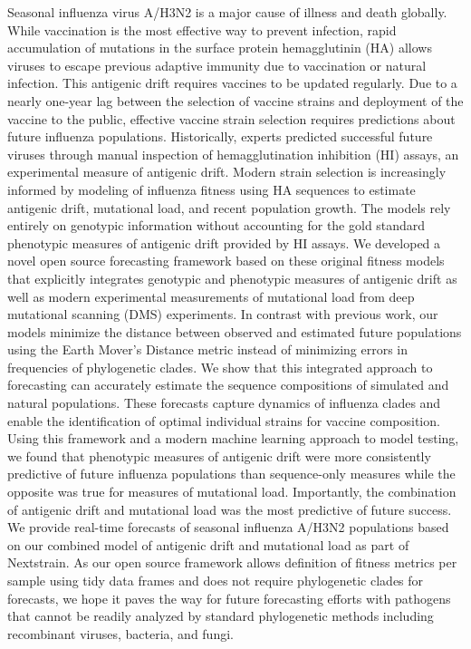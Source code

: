 Seasonal influenza virus A/H3N2 is a major cause of illness and death globally.
While vaccination is the most effective way to prevent infection, rapid accumulation of mutations in the surface protein hemagglutinin (HA) allows viruses to escape previous adaptive immunity due to vaccination or natural infection.
This antigenic drift requires vaccines to be updated regularly.
Due to a nearly one-year lag between the selection of vaccine strains and deployment of the vaccine to the public, effective vaccine strain selection requires predictions about future influenza populations.
Historically, experts predicted successful future viruses through manual inspection of hemagglutination inhibition (HI) assays, an experimental measure of antigenic drift.
Modern strain selection is increasingly informed by modeling of influenza fitness using HA sequences to estimate antigenic drift, mutational load, and recent population growth.
The models rely entirely on genotypic information without accounting for the gold standard phenotypic measures of antigenic drift provided by HI assays.
We developed a novel open source forecasting framework based on these original fitness models that explicitly integrates genotypic and phenotypic measures of antigenic drift as well as modern experimental measurements of mutational load from deep mutational scanning (DMS) experiments.
In contrast with previous work, our models minimize the distance between observed and estimated future populations using the Earth Mover's Distance metric instead of minimizing errors in frequencies of phylogenetic clades.
We show that this integrated approach to forecasting can accurately estimate the sequence compositions of simulated and natural populations.
These forecasts capture dynamics of influenza clades and enable the identification of optimal individual strains for vaccine composition.
Using this framework and a modern machine learning approach to model testing, we found that phenotypic measures of antigenic drift were more consistently predictive of future influenza populations than sequence-only measures while the opposite was true for measures of mutational load.
Importantly, the combination of antigenic drift and mutational load was the most predictive of future success.
We provide real-time forecasts of seasonal influenza A/H3N2 populations based on our combined model of antigenic drift and mutational load as part of Nextstrain.
As our open source framework allows definition of fitness metrics per sample using tidy data frames and does not require phylogenetic clades for forecasts, we hope it paves the way for future forecasting efforts with pathogens that cannot be readily analyzed by standard phylogenetic methods including recombinant viruses, bacteria, and fungi.
